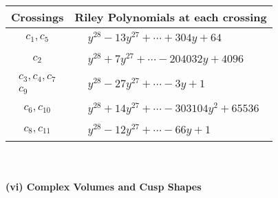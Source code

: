 \documentclass[1p]{elsarticle_modified}
\theoremstyle{definition}
\begin{document}
\begin{tabular}{m{50pt}|m{274pt}}
Crossings & \hspace{64pt}Riley Polynomials at each crossing \\
\hline $$\begin{aligned}c_{1},c_{5}\end{aligned}$$&$\begin{aligned}
&y^{28}-13 y^{27}+\cdots+304 y+64
\end{aligned}$\\
\hline $$\begin{aligned}c_{2}\end{aligned}$$&$\begin{aligned}
&y^{28}+7 y^{27}+\cdots-204032 y+4096
\end{aligned}$\\
\hline $$\begin{aligned}c_{3},c_{4},c_{7}\\c_{9}\end{aligned}$$&$\begin{aligned}
&y^{28}-27 y^{27}+\cdots-3 y+1
\end{aligned}$\\
\hline $$\begin{aligned}c_{6},c_{10}\end{aligned}$$&$\begin{aligned}
&y^{28}+14 y^{27}+\cdots-303104 y^2+65536
\end{aligned}$\\
\hline $$\begin{aligned}c_{8},c_{11}\end{aligned}$$&$\begin{aligned}
&y^{28}-12 y^{27}+\cdots-66 y+1
\end{aligned}$\\
\hline
\end{tabular}\\~\\
\newpage\flushleft \textbf{(vi) Complex Volumes and Cusp Shapes}
\end{document}
